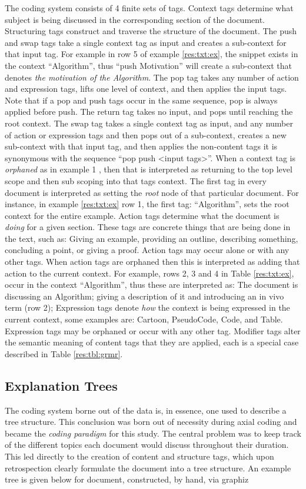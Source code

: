 \documentclass[sigconf]{acmart}
\begin{document}
The coding system consists of 4 finite sets of tags. Context tags determine what
subject is being discussed in the corresponding section of the document.
%
Structuring tags construct and traverse the structure of the document. The
push and swap tags take a single context tag as input and creates a sub-context
for that input tag. For example in row 5 of example \ref{res:txt:ex}, the
snippet exists in the context ``Algorithm'', thus ``push Motivation'' will
create a sub-context that denotes \emph{the motivation of the Algorithm}.
%
The pop tag takes any number of action and expression tags, lifts one level of
context, and then applies the input tags. Note that if a pop and push tags occur
in the same sequence, pop is always applied before push. The return tag takes no
input, and pops until reaching the root context. The swap tag takes a single
context tag as input, and any number of action or expression tags and then pops
out of a sub-context, creates a new sub-context with that input tag, and
then applies the non-content tags it is synonymous with the sequence ``pop push
<input tags>''.
%
When a context tag is \emph{orphaned} as in example 1 , then that is interpreted as returning to the top level scope and then
sub scoping into that tags context. The first tag in every document is
interpreted as setting the \emph{root} node of that particular document. For
instance, in example \ref{res:txt:ex} row 1, the first tag: ``Algorithm'', sets
the root context for the entire example.
%
Action tags determine what the document is \emph{doing} for a given section.
These tags are concrete things that are being done in the text, such as: Giving
an example, providing an outline, describing something, concluding a point, or
giving a proof. Action tags may occur alone or with any other tags. When action
tags are orphaned then this is interpreted as adding that action to the current
context. For example, rows 2, 3 and 4 in Table \ref{res:txt:ex}, occur in the
context ``Algorithm'', thus these are interpreted as: The document is discussing
an Algorithm; giving a description of it and introducing an in vivo term (row
2); 
%
Expression tags denote \emph{how} the context is being expressed in the current
context, some examples are: Cartoon, PseudoCode, Code, and Table. Expression
tags may be orphaned or occur with any other tag. Modifier tags alter the
semantic meaning of content tags that they are applied, each is a special case
described in Table \ref{res:tbl:grmr}.
%

\subsection{Explanation Trees}
\label{sec:res:xopTree}
The coding system borne out of the data is, in essence, one used to describe a
tree structure. This conclusion was born out of necessity during axial coding
and became the \emph{coding paradigm} for this study. The central problem was to
keep track of the different topics each document would discuss throughout their
duration. This led directly to the creation of content and structure tags, which
upon retrospection clearly formulate the document into a tree structure. An
example tree is given below for document, constructed, by hand, via
graphiz
\end{document}
